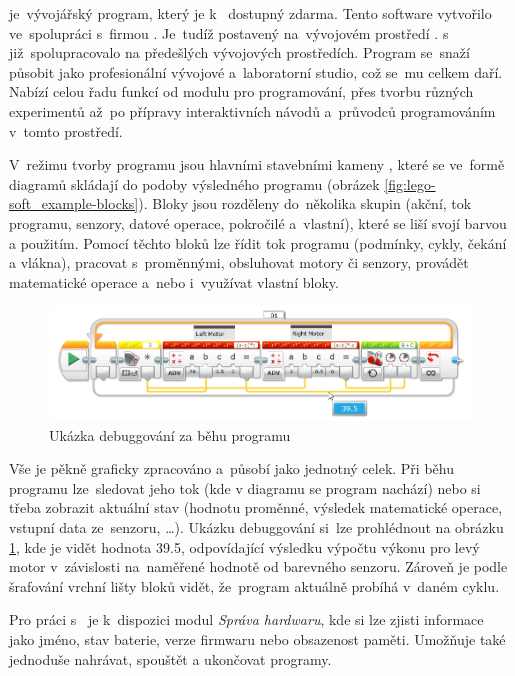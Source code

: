 \legoSW{} je~vývojářský program, který je k~\EVthree{} dostupný zdarma. 
Tento  software vytvořilo \lego{} ve~spolupráci s~firmou \NI{}. 
Je~tudíž postavený na~vývojovém prostředí \labview{}. 
\lego{} s~\NI{} již~spolupracovalo na předešlých vývojových prostředích. 
Program se~snaží působit jako profesionální vývojové a~laboratorní studio, což se~mu celkem daří.
Nabízí celou řadu funkcí od modulu pro programování, přes tvorbu různých experimentů až~po přípravy interaktivních návodů a~průvodců programováním v~tomto prostředí.

V~režimu tvorby programu jsou hlavními stavebními kameny \EVblocks, které se ve~formě diagramů skládají do podoby výsledného programu (obrázek \ref{fig:lego-soft_example-blocks}).
Bloky jsou rozděleny do~několika skupin (akční, tok programu, senzory, datové operace, pokročilé a~vlastní), které se liší svojí barvou a použitím. 
Pomocí těchto bloků lze řídit tok programu (podmínky, cykly, čekání a vlákna), pracovat s~proměnnými, obsluhovat motory či senzory, provádět matematické operace a~nebo i~využívat vlastní bloky.

\begin{figure}[h]
	\centering
	\includegraphics[width=\textwidth]{images/lego-soft_live-debugging_line-advance.png}
	\caption{Ukázka debuggování za běhu programu}
	\label{fig:lego-soft_live-debugging_line-advance}
\end{figure}

Vše je pěkně graficky zpracováno a~působí jako jednotný celek. 
Při běhu programu lze~sledovat jeho tok (kde v diagramu se program nachází) nebo si třeba zobrazit aktuální stav (hodnotu proměnné, výsledek matematické operace, vstupní data ze~senzoru, \dots). 
Ukázku debuggování si~lze prohlédnout na obrázku \ref{fig:lego-soft_live-debugging_line-advance}, kde je vidět hodnota 39.5, odpovídající výsledku výpočtu výkonu pro levý motor v~závislosti na~naměřené hodnotě od barevného senzoru.
Zároveň je podle šrafování vrchní lišty bloků vidět, že~program aktuálně probíhá v~daném cyklu.

Pro práci s~ je k~dispozici modul {\it Správa hardwaru}, kde si lze zjisti informace jako jméno, stav baterie, verze firmwaru nebo obsazenost paměti. 
Umožňuje také jednoduše nahrávat, spouštět a ukončovat programy. 

